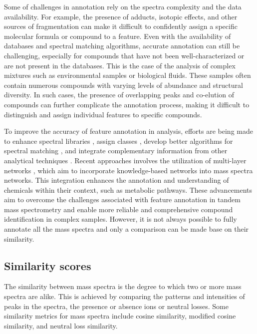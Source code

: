 Some of challenges in annotation rely on the spectra complexity and the data availability. For example, the presence of adducts, isotopic effects, and other sources of fragmentation can make it difficult to confidently assign a specific molecular formula or compound to a feature. Even with the availability of databases and spectral matching algorithms, accurate annotation can still be challenging, especially for compounds that have not been well-characterized or are not present in the databases. This is the case of the analysis of complex mixtures such as environmental samples or biological fluids. These samples often contain numerous compounds with varying levels of abundance and structural diversity. In such cases, the presence of overlapping peaks and co-elution of compounds can further complicate the annotation process, making it difficult to distinguish and assign individual features to specific compounds.

To improve the accuracy of feature annotation in \tMS{} analysis, efforts are being made to enhance spectral libraries \cite{Yang2020}\cite{Wang2020}, assign classes \cite{Dhrkop2020}, develop better algorithms for spectral matching \cite{huber_MS2deepscore_2021}\cite{deJonge2023}, and integrate complementary information from other analytical techniques \cite{Djukovic2020}.  Recent approaches involves the utilization of multi-layer networks \cite{amara_networks_2022}, which aim to incorporate knowledge-based networks into mass spectra networks. This integration enhances the annotation and understanding of chemicals within their context, such as metabolic pathways. These advancements aim to overcome the challenges associated with feature annotation in tandem mass spectrometry and enable more reliable and comprehensive compound identification in complex samples. However, it is not always possible to fully annotate all the mass spectra and only a comparison can be made base on their similarity.


\subsection*{Similarity scores}

The similarity between mass spectra is the degree to which two or more mass spectra are alike. This is achieved by comparing the patterns and intensities of peaks in the spectra, the presence or absence ions or neutral losses. Some similarity metrics for mass spectra include cosine similarity, modified cosine similarity, and neutral loss similarity. 

